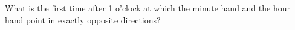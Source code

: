 What is the first time after 1 o'clock at which the minute hand and the hour hand point in exactly opposite directions?
